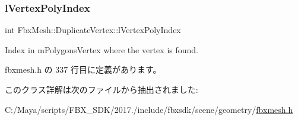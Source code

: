 \subsubsection{\texorpdfstring{l\+Vertex\+Poly\+Index}{lVertexPolyIndex}}
{\footnotesize\ttfamily int Fbx\+Mesh\+::\+Duplicate\+Vertex\+::l\+Vertex\+Poly\+Index}



Index in m\+Polygons\+Vertex where the vertex is found. 



 fbxmesh.\+h の 337 行目に定義があります。



このクラス詳解は次のファイルから抽出されました\+:\begin{DoxyCompactItemize}
\item 
C\+:/\+Maya/scripts/\+F\+B\+X\+\_\+\+S\+D\+K/2017./include/fbxsdk/scene/geometry/\hyperlink{fbxmesh_8h}{fbxmesh.\+h}\end{DoxyCompactItemize}
